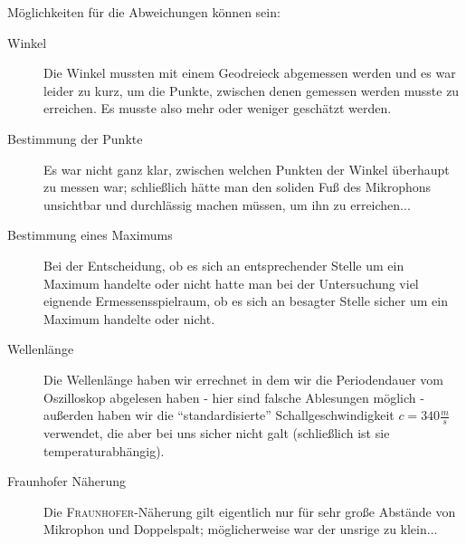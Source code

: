  Möglichkeiten für die Abweichungen können sein:
\begin{description}
   \item[Winkel] Die Winkel mussten mit einem Geodreieck abgemessen werden und es war leider zu kurz, um die Punkte, zwischen denen gemessen werden musste zu erreichen. Es musste also mehr oder weniger geschätzt werden.
   
   \item[Bestimmung der Punkte] Es war nicht ganz klar, zwischen welchen Punkten der Winkel überhaupt zu messen war; schließlich hätte man den soliden Fuß des Mikrophons unsichtbar und durchlässig machen müssen, um ihn zu erreichen...
   
   \item[Bestimmung eines Maximums] Bei der Entscheidung, ob es sich an entsprechender Stelle um ein Maximum handelte oder nicht hatte man bei der Untersuchung viel eignende Ermessensspielraum, ob es sich an besagter Stelle sicher um ein Maximum handelte oder nicht.
   
   \item[Wellenlänge] Die Wellenlänge haben wir errechnet in dem wir die Periodendauer vom Oszilloskop abgelesen haben - hier sind falsche Ablesungen möglich - außerden haben wir die ``standardisierte'' Schallgeschwindigkeit \(c = 340\frac{m}{s} \) verwendet, die aber bei uns sicher nicht galt (schließlich ist sie temperaturabhängig).
   
   \item[Fraunhofer Näherung] Die \textsc{Fraunhofer}-Näherung gilt eigentlich nur für sehr große Abstände von Mikrophon und Doppelspalt; möglicherweise war der unsrige zu klein...
\end{description}




